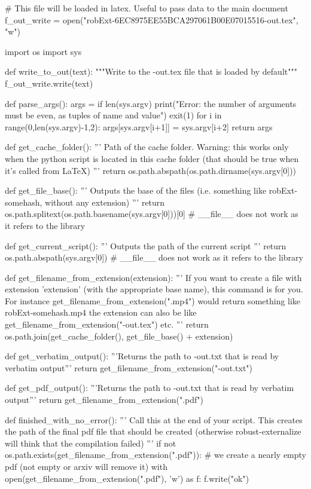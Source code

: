 
# This file will be loaded in latex. Useful to pass data to the main document
f_out_write = open("robExt-6EC8975EE55BCA297061B00E07015516-out.tex", "w")

import os
import sys

def write_to_out(text):
    """Write to the -out.tex file that is loaded by default"""
    f_out_write.write(text)

def parse_args():
    args = {}
    if len(sys.argv) %
        print("Error: the number of arguments must be even, as tuples of name and value")
        exit(1)
    for i in range(0,len(sys.argv)-1,2):
        args[sys.argv[i+1]] = sys.argv[i+2]
    return args

def get_cache_folder():
    '''
    Path of the cache folder. Warning: this works only when the python script
    is located in this cache folder (that should be true when it's called from LaTeX)
    '''
    return os.path.abspath(os.path.dirname(sys.argv[0]))

def get_file_base():
    '''
    Outputs the base of the files (i.e. something like robExt-somehash, without any extension)
    '''
    return os.path.splitext(os.path.basename(sys.argv[0]))[0] # __file__ does not work as it refers to the library

def get_current_script():
    '''
    Outputs the path of the current script
    '''
    return os.path.abspath(sys.argv[0]) # __file__ does not work as it refers to the library


def get_filename_from_extension(extension):
    '''
    If you want to create a file with extension 'extension' (with the appropriate base name), this command
    is for you. For instance get_filename_from_extension(".mp4") would return something like
    robExt-somehash.mp4
    the extension can also be like get_filename_from_extension("-out.tex") etc.
    '''
    return os.path.join(get_cache_folder(), get_file_base() + extension)

def get_verbatim_output():
    '''Returns the path to -out.txt that is read by verbatim output'''
    return get_filename_from_extension("-out.txt")

def get_pdf_output():
    '''Returns the path to -out.txt that is read by verbatim output'''
    return get_filename_from_extension(".pdf")


def finished_with_no_error():
    '''
    Call this at the end of your script. This creates the path of the final pdf file that should be
    created (otherwise robust-externalize will think that the compilation failed)
    '''
    if not os.path.exists(get_filename_from_extension(".pdf")):
        # we create a nearly empty pdf (not empty or arxiv will remove it)
        with open(get_filename_from_extension(".pdf"), 'w') as f:
            f.write("ok")

